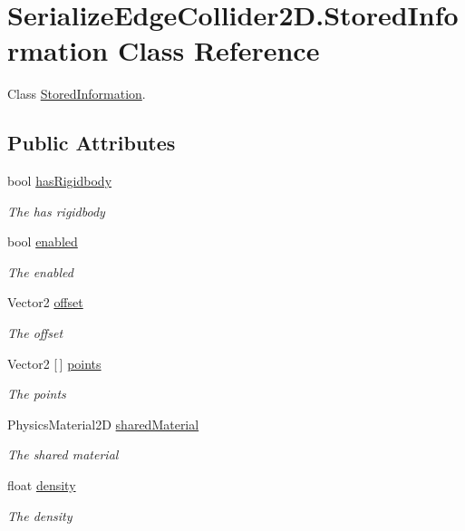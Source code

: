 \hypertarget{class_serialize_edge_collider2_d_1_1_stored_information}{}\section{Serialize\+Edge\+Collider2\+D.\+Stored\+Information Class Reference}
\label{class_serialize_edge_collider2_d_1_1_stored_information}


Class \hyperlink{class_serialize_edge_collider2_d_1_1_stored_information}{Stored\+Information}.  


\subsection*{Public Attributes}
\begin{DoxyCompactItemize}
\item 
bool \hyperlink{class_serialize_edge_collider2_d_1_1_stored_information_ad480a1309078ccdd1772de0188625375}{has\+Rigidbody}
\begin{DoxyCompactList}\small\item\em The has rigidbody \end{DoxyCompactList}\item 
bool \hyperlink{class_serialize_edge_collider2_d_1_1_stored_information_abd727d60c429d3ce666c92f3152ae202}{enabled}
\begin{DoxyCompactList}\small\item\em The enabled \end{DoxyCompactList}\item 
Vector2 \hyperlink{class_serialize_edge_collider2_d_1_1_stored_information_afb1eceffc5721a6224b7f850e165d3fc}{offset}
\begin{DoxyCompactList}\small\item\em The offset \end{DoxyCompactList}\item 
Vector2 \mbox{[}$\,$\mbox{]} \hyperlink{class_serialize_edge_collider2_d_1_1_stored_information_a3ffb0af8c7219156a5aea005cb499f69}{points}
\begin{DoxyCompactList}\small\item\em The points \end{DoxyCompactList}\item 
Physics\+Material2D \hyperlink{class_serialize_edge_collider2_d_1_1_stored_information_a0c803dc46a2818960d52a82de7481ca8}{shared\+Material}
\begin{DoxyCompactList}\small\item\em The shared material \end{DoxyCompactList}\item 
float \hyperlink{class_serialize_edge_collider2_d_1_1_stored_information_a511d8f63b8ccba59c22164edd05a3518}{density}
\begin{DoxyCompactList}\small\item\em The density \end{DoxyCompactList}\end{DoxyCompactItemize}


